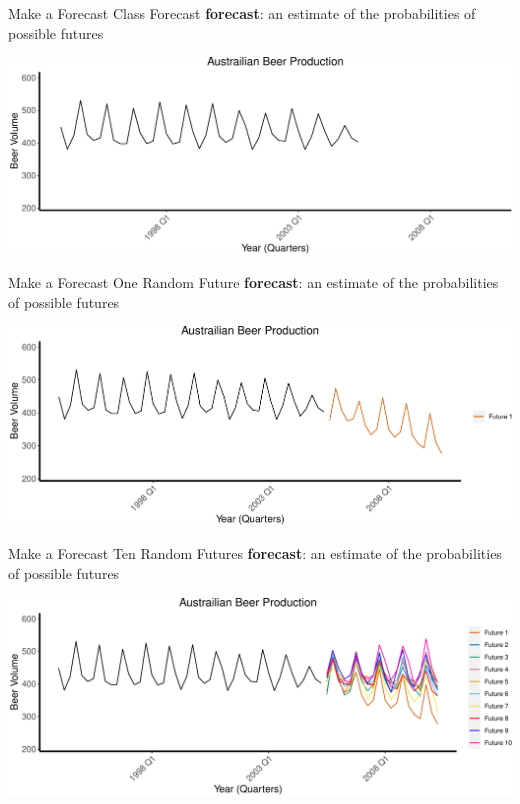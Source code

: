 \documentclass[
  ignorenonframetext,
]{beamer}
\begin{document}
\begin{frame}{Make a Forecast \textbar{} \small Class Forecast}
\protect\hypertarget{make-a-forecast-class-forecast}{}
\textbf{forecast}: an estimate of the probabilities of possible futures

\vpsace{2cm}

\includegraphics{Time-series-regression-models_files/figure-beamer/unnamed-chunk-4-1.pdf}
\end{frame}

\begin{frame}{Make a Forecast \textbar{} \small One Random Future}
\protect\hypertarget{make-a-forecast-one-random-future}{}
\textbf{forecast}: an estimate of the probabilities of possible futures

\vpsace{2cm}

\includegraphics{Time-series-regression-models_files/figure-beamer/unnamed-chunk-5-1.pdf}
\end{frame}

\begin{frame}{Make a Forecast \textbar{} \small Ten Random Futures}
\protect\hypertarget{make-a-forecast-ten-random-futures}{}
\textbf{forecast}: an estimate of the probabilities of possible futures

\vpsace{2cm}

\includegraphics{Time-series-regression-models_files/figure-beamer/unnamed-chunk-6-1.pdf}
\end{frame}
\end{document}
